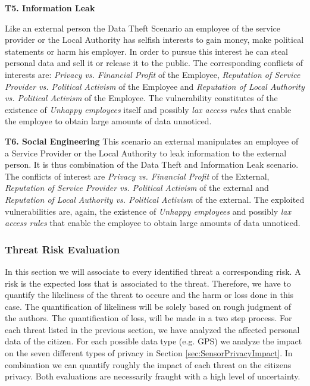 \documentclass[runningheads,a4paper]{llncs}
\begin{document}
\textbf{T5. Information Leak}

Like an external person the Data Theft Scenario an employee of the
service provider or the Local Authority has selfish interests to gain
money, make political statements or harm his employer.  In order to
pursue this interest he can steal personal data and sell it or release
it to the public.  The corresponding conflicts of interests are:
\textit{Privacy vs. Financial Profit} of the Employee, \textit{Reputation of Service
  Provider vs. Political Activism} of the Employee and \textit{Reputation of Local
  Authority vs. Political Activism} of the Employee.  The vulnerability constitutes of
the existence of \textit{Unhappy employees} itself and possibly \textit{lax access
rules} that enable the employee to obtain large amounts of data
unnoticed.

\textbf{T6. Social Engineering}
This scenario an external manipulates an employee of a Service
Provider or the Local Authority to leak information to the external
person.  It is thus combination of the Data Theft and Information Leak
scenario.
The conflicts of interest are \textit{Privacy vs. Financial Profit} of
the External, \textit{Reputation of Service Provider vs. Political
  Activism} of the external and \textit{Reputation of Local Authority
  vs. Political Activism} of the external.  The exploited
vulnerabilities are, again, the existence of \textit{Unhappy
  employees} and possibly \textit{lax access rules} that enable the
employee to obtain large amounts of data unnoticed.


\subsubsection{Threat Risk Evaluation}

In this section we will associate to every identified threat a corresponding risk. A risk is the expected loss that is associated to the threat.
Therefore, we have to quantify the likeliness of the threat to occure and the harm or loss done in this case.
The quantification of likeliness will be solely based on rough judgment of the authors.
The quantification of loss, will be made in a two step process.
For each threat listed in the previous section, we have analyzed the affected personal data of the citizen.
For each possible data type (e.g. GPS) we analyze the impact on the seven different types of privacy in Section \ref{sec:SensorPrivacyImpact}.
In combination we can quantify roughly the impact of each threat on the citizens privacy. Both evaluations are necessarily fraught with a high level of uncertainty.
\end{document}
